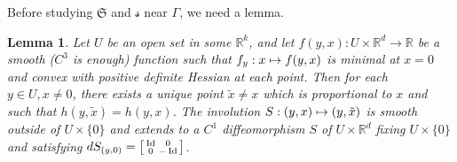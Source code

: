 \documentclass[JEP,XML,SOM,Unicode,published]{cedram}
\newcommand\mto{\mathchoice{\longmapsto}{\mapsto}{\mapsto}{\mapsto}}
\newenvironment{smallbmatrix}{\big[\begin{smallmatrix}}{\end{smallmatrix}\big]}
\DeclareMathOperator{\Id}{Id}
\newcommand{\Rm}{\mathbb{R}}
\newcommand{\gS}{\ensuremath{\mathfrak{S}}}
\newcommand{\ms}{\ensuremath{\mathscr{s}}}
\theoremstyle{plain}
\newtheorem{lem}{Lemma}
\theoremstyle{definition}
\begin{document}
Before studying $\gS$ and $\ms$ near $\Gamma$, we need a lemma.

\begin{lem}\label{lem-sym}
Let $U$ be an open set in some $\Rm^k$, and let $f(y,x):U\times \Rm^d\to \Rm$ be a smooth ($C^3$ is enough) function such that
$f_y:x\mto f(y,x)$ is minimal at $x=0$ and convex with positive definite Hessian at each point.
Then for each $y\in U, x\neq 0$, there exists a unique point $\tilde x \neq x$ which is proportional to $x$ and such that
$h(y,\tilde x)=h(y,x)$.
The involution $S:(y,x)\mto (y,\tilde x)$ is smooth outside of $U\times \{0\}$ and extends to a $C^1$ diffeomorphism $S$ of $U\times\Rm^d$ fixing $U\times \{0\}$
and satisfying $dS_{(y,0)}=
\begin{smallbmatrix} \Id & 0\\ 0 &-\Id\end{smallbmatrix}$.
\end{lem}
\end{document}
